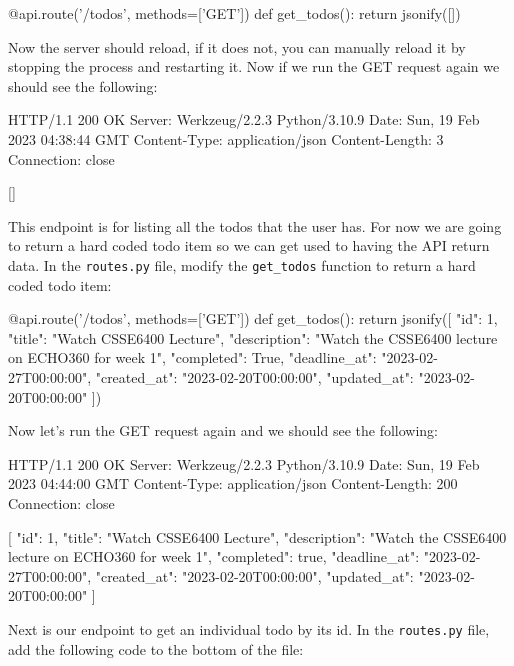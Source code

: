 \documentclass{csse4400}
\begin{document}
\begin{code}[language=python]{}
  @api.route('/todos', methods=['GET'])
  def get_todos():
      return jsonify([])
\end{code}

Now the server should reload, if it does not, you can manually reload it by stopping the process and restarting it. Now if we run the GET request again we should see the following:

\begin{code}[language=json,numbers=none]{}
  HTTP/1.1 200 OK
  Server: Werkzeug/2.2.3 Python/3.10.9
  Date: Sun, 19 Feb 2023 04:38:44 GMT
  Content-Type: application/json
  Content-Length: 3
  Connection: close
  
  []
\end{code}

This endpoint is for listing all the todos that the user has. For now we are going to return a hard coded todo item so we can get used to having the API return data. In the \texttt{routes.py} file, modify the \texttt{get\_todos} function to return a hard coded todo item:

\begin{code}[language=python]{}
  @api.route('/todos', methods=['GET'])
  def get_todos():
      return jsonify([{
        "id": 1,
        "title": "Watch CSSE6400 Lecture",
        "description": "Watch the CSSE6400 lecture on ECHO360 for week 1",
        "completed": True,
        "deadline_at": "2023-02-27T00:00:00",
        "created_at": "2023-02-20T00:00:00",
        "updated_at": "2023-02-20T00:00:00"
      }])
\end{code}

Now let's run the GET request again and we should see the following:

\begin{code}[language=json,numbers=none]{}
  HTTP/1.1 200 OK
  Server: Werkzeug/2.2.3 Python/3.10.9
  Date: Sun, 19 Feb 2023 04:44:00 GMT
  Content-Type: application/json
  Content-Length: 200
  Connection: close
  
  [
    {
      "id": 1,
      "title": "Watch CSSE6400 Lecture",
      "description": "Watch the CSSE6400 lecture on ECHO360 for week 1",
      "completed": true,
      "deadline_at": "2023-02-27T00:00:00",
      "created_at": "2023-02-20T00:00:00",
      "updated_at": "2023-02-20T00:00:00"
    }
  ]
\end{code}

Next is our endpoint to get an individual todo by its id. In the \texttt{routes.py} file, add the following code to the bottom of the file:
\end{document}
